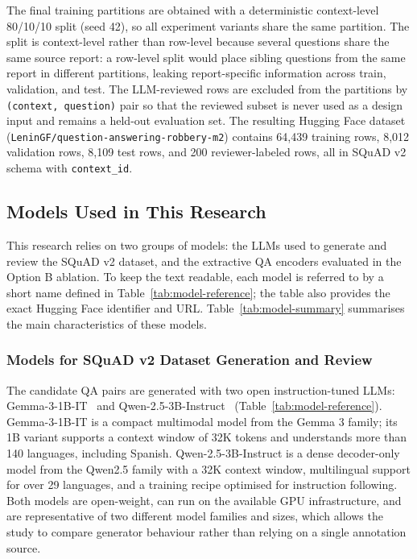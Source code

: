 \documentclass[graybox]{SNmult}
\begin{document}
The final training partitions are obtained with a deterministic context-level
80/10/10 split (seed 42), so all experiment variants share the same partition.
The split is context-level rather than row-level because several questions
share the same source report: a row-level split would place sibling questions
from the same report in different partitions, leaking report-specific
information across train, validation, and test. The LLM-reviewed rows are
excluded from the partitions by \texttt{(context, question)} pair so that the
reviewed subset is never used as a design input and remains a held-out
evaluation set.
The resulting Hugging Face dataset
(\texttt{LeninGF/question-answering-robbery-m2}) contains 64{,}439 training
rows, 8{,}012 validation rows, 8{,}109 test rows, and 200 reviewer-labeled rows, all
in SQuAD v2 schema with \texttt{context\_id}.

\subsection{Models Used in This Research}
\label{sec:models}

This research relies on two groups of models: the LLMs used to generate and
review the SQuAD v2 dataset, and the extractive QA encoders evaluated in the
Option B ablation. To keep the text readable, each model is referred to by a
short name defined in Table~\ref{tab:model-reference}; the table also provides
the exact Hugging Face identifier and URL. Table~\ref{tab:model-summary}
summarises the main characteristics of these models.

\subsubsection{Models for SQuAD v2 Dataset Generation and Review}
\label{sec:models-generation}

The candidate QA pairs are generated with two open instruction-tuned LLMs:
Gemma-3-1B-IT~\cite{gemma3_1b_hf,gemma3_techreport} and
Qwen-2.5-3B-Instruct~\cite{qwen2_5_3b_hf,qwen2_5_techreport}
(Table~\ref{tab:model-reference}). Gemma-3-1B-IT is a compact multimodal model
from the Gemma 3 family; its 1B variant supports a context window of 32K
tokens and understands more than 140 languages, including Spanish.
Qwen-2.5-3B-Instruct is a dense decoder-only model from the Qwen2.5 family
with a 32K context window, multilingual support for over 29 languages, and a
training recipe optimised for instruction following. Both models are
open-weight, can run on the available GPU infrastructure, and are
representative of two different model families and sizes, which allows the
study to compare generator behaviour rather than relying on a single
annotation source.
\end{document}
